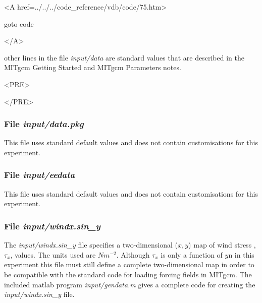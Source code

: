 \begin{itemize}
{\bf
\begin{rawhtml} <A href=../../../code_reference/vdb/code/75.htm> \end{rawhtml}
goto code
\begin{rawhtml} </A>\end{rawhtml}
}

\end{itemize}

\noindent other lines in the file {\it input/data} are standard values
that are described in the MITgcm Getting Started and MITgcm Parameters
notes.

\begin{rawhtml}<PRE>\end{rawhtml}
\begin{small}

\end{small}
\begin{rawhtml}</PRE>\end{rawhtml}

\subsubsection{File {\it input/data.pkg}}

This file uses standard default values and does not contain
customisations for this experiment.

\subsubsection{File {\it input/eedata}}

This file uses standard default values and does not contain
customisations for this experiment.

\subsubsection{File {\it input/windx.sin\_y}}

The {\it input/windx.sin\_y} file specifies a two-dimensional ($x,y$) 
map of wind stress ,$\tau_{x}$, values. The units used are $Nm^{-2}$.
Although $\tau_{x}$ is only a function of $y$n in this experiment
this file must still define a complete two-dimensional map in order
to be compatible with the standard code for loading forcing fields 
in MITgcm. The included matlab program {\it input/gendata.m} gives a complete
code for creating the {\it input/windx.sin\_y} file.


